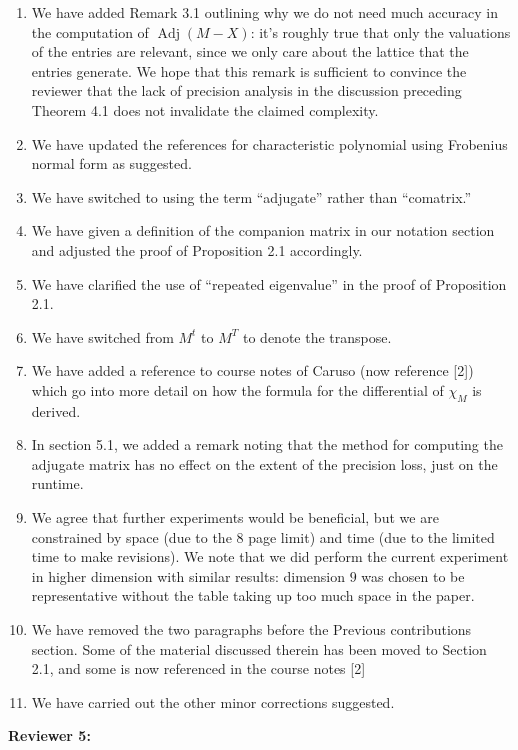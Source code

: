 \documentclass{article}
\DeclareMathOperator{\adj}{Adj}
\newcommand{\done}[1]{#1}
\begin{document}
\begin{enumerate}
\item \done{We have added Remark 3.1 outlining why we do not need much accuracy in the computation of $\adj(M{-}X)$: it's roughly true that only the valuations of the entries are relevant, since we only care about the lattice that the entries generate.  We hope that this remark is sufficient to convince the reviewer that the lack of precision analysis in the discussion preceding Theorem 4.1 does not invalidate the claimed complexity.}
\item \done{We have updated the references for characteristic polynomial using Frobenius normal form as suggested.}
\item \done{We have switched to using the term ``adjugate'' rather than ``comatrix.''}
\item \done{We have given a definition of the companion matrix in our notation section and adjusted the proof of Proposition 2.1 accordingly.}
\item \done{We have clarified the use of ``repeated eigenvalue'' in the proof of Proposition 2.1.}
\item \done{We have switched from $M^t$ to $M^T$ to denote the transpose.}
\item \done{We have added a reference to course notes of Caruso (now reference [2]) which go into more detail on how the formula for the differential of $\chi_M$ is derived.}
\item \done{In section 5.1, we added a remark noting that the method for computing the adjugate matrix has no effect on the extent of the precision loss, just on the runtime.}
\item \done{We agree that further experiments would be beneficial, but we are constrained by space (due to the 8 page limit) and time (due to the limited time to make revisions).  We note that we did perform the current experiment in higher dimension with similar results: dimension $9$ was chosen to be representative without the table taking up too much space in the paper.}
\item \done{We have removed the two paragraphs before the Previous contributions section.  Some of the material discussed therein has been moved to Section 2.1, and some is now referenced in the course notes [2]}
\item \done{We have carried out the other minor corrections suggested.}
\end{enumerate}
\textbf{Reviewer 5:}
\end{document}
